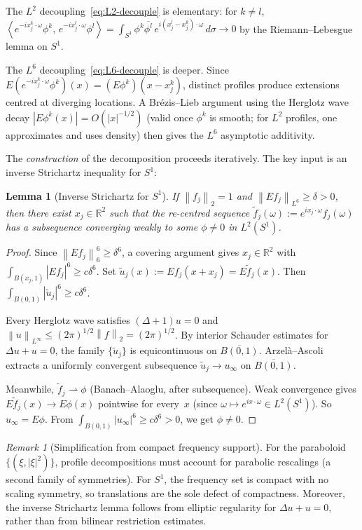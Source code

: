 \documentclass[12pt]{article}
\newtheorem{lemma}[theorem]{Lemma}
\theoremstyle{definition}
\theoremstyle{remark}
\newtheorem{remark}[theorem]{Remark}
\newcommand{\R}{\mathbb{R}}
\newcommand{\norm}[1]{\left\|#1\right\|}
\newcommand{\ip}[2]{\left\langle #1,\, #2\right\rangle}
\begin{document}
The $L^2$ decoupling~\eqref{eq:L2-decouple} is elementary:
for $k\neq l$,
$\ip{e^{-ix_j^k\cdot\omega}\phi^k}{e^{-ix_j^l\cdot\omega}\phi^l}
=\int_{S^1}\phi^k\overline{\phi^l}\,
e^{i(x_j^l-x_j^k)\cdot\omega}\,d\sigma\to 0$
by the Riemann--Lebesgue lemma on $S^1$.

The $L^6$ decoupling~\eqref{eq:L6-decouple} is deeper.  Since
$E(e^{-ix_j^k\cdot\omega}\phi^k)(x)=(E\phi^k)(x-x_j^k)$, distinct
profiles produce extensions centred at diverging locations.  A
Br\'ezis--Lieb argument using the Herglotz wave decay
$|E\phi^k(x)|=O(|x|^{-1/2})$ (valid once $\phi^k$ is smooth;
for $L^2$ profiles, one approximates and uses density) then gives the
$L^6$ asymptotic additivity.

The \emph{construction} of the decomposition proceeds iteratively.
The key input is an inverse Strichartz inequality for $S^1$:

\begin{lemma}[Inverse Strichartz for $S^1$]
  \label{lem:inv-strichartz}
  If $\norm{f_j}_2=1$ and $\norm{Ef_j}_{L^6}\geq\delta>0$, then
  there exist $x_j\in\R^2$ such that the re-centred sequence
  $\tilde f_j(\omega):=e^{ix_j\cdot\omega}f_j(\omega)$ has a
  subsequence converging weakly to some $\phi\neq 0$ in $L^2(S^1)$.
\end{lemma}

\begin{proof}
  Since $\norm{Ef_j}_6^6\geq\delta^6$, a covering argument gives
  $x_j\in\R^2$ with $\int_{B(x_j,1)}|Ef_j|^6\geq c\delta^6$.
  Set $\tilde u_j(x):=Ef_j(x+x_j)=E\tilde f_j(x)$.  Then
  $\int_{B(0,1)}|\tilde u_j|^6\geq c\delta^6$.

  Every Herglotz wave satisfies $(\Delta+1)u=0$ and
  $\norm{u}_{L^\infty}\leq(2\pi)^{1/2}\norm{f}_2=(2\pi)^{1/2}$.
  By interior Schauder estimates for $\Delta u+u=0$, the family
  $\{\tilde u_j\}$ is equicontinuous on $\overline{B(0,1)}$.
  Arzel\`a--Ascoli extracts a uniformly convergent subsequence
  $\tilde u_j\to u_\infty$ on $\overline{B(0,1)}$.

  Meanwhile, $\tilde f_j\rightharpoonup\phi$ (Banach--Alaoglu,
  after subsequence).  Weak convergence gives
  $E\tilde f_j(x)\to E\phi(x)$ pointwise for every~$x$
  (since $\omega\mapsto e^{ix\cdot\omega}\in L^2(S^1)$).  So
  $u_\infty=E\phi$.  From
  $\int_{B(0,1)}|u_\infty|^6\geq c\delta^6>0$, we get
  $\phi\neq 0$.
\end{proof}

\begin{remark}[Simplification from compact frequency support]
  For the paraboloid $\{(\xi,|\xi|^2)\}$, profile decompositions must
  account for parabolic rescalings (a second family of symmetries).
  For $S^1$, the frequency set is compact with no scaling symmetry,
  so translations are the sole defect of compactness.  Moreover, the
  inverse Strichartz lemma follows from elliptic regularity for
  $\Delta u+u=0$, rather than from bilinear restriction estimates.
\end{remark}
\end{document}

